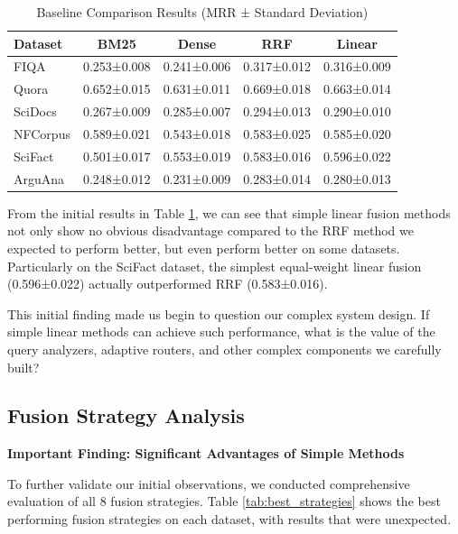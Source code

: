 \documentclass[letterpaper]{article} %
\begin{document}
\begin{table}[t]
\centering
\caption{Baseline Comparison Results (MRR ± Standard Deviation)}
\label{tab:baseline}
\small
\begin{tabular}{lcccc}
\toprule
Dataset & BM25 & Dense & RRF & Linear \\
\midrule
FIQA & 0.253±0.008 & 0.241±0.006 & 0.317±0.012 & 0.316±0.009 \\
Quora & 0.652±0.015 & 0.631±0.011 & 0.669±0.018 & 0.663±0.014 \\
SciDocs & 0.267±0.009 & 0.285±0.007 & 0.294±0.013 & 0.290±0.010 \\
NFCorpus & 0.589±0.021 & 0.543±0.018 & 0.583±0.025 & 0.585±0.020 \\
SciFact & 0.501±0.017 & 0.553±0.019 & 0.583±0.016 & 0.596±0.022 \\
ArguAna & 0.248±0.012 & 0.231±0.009 & 0.283±0.014 & 0.280±0.013 \\
\bottomrule
\end{tabular}
\end{table}

From the initial results in Table \ref{tab:baseline}, we can see that simple linear fusion methods not only show no obvious disadvantage compared to the RRF method we expected to perform better, but even perform better on some datasets. Particularly on the SciFact dataset, the simplest equal-weight linear fusion (0.596±0.022) actually outperformed RRF (0.583±0.016).

This initial finding made us begin to question our complex system design. If simple linear methods can achieve such performance, what is the value of the query analyzers, adaptive routers, and other complex components we carefully built?

\subsection{Fusion Strategy Analysis}

\textbf{Important Finding: Significant Advantages of Simple Methods}

To further validate our initial observations, we conducted comprehensive evaluation of all 8 fusion strategies. Table \ref{tab:best_strategies} shows the best performing fusion strategies on each dataset, with results that were unexpected.
\end{document}
